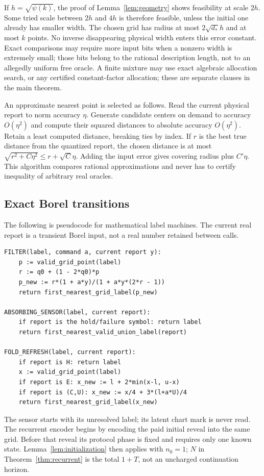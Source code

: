 If $h=\sqrt{\psi(k)}$, the proof of Lemma~\ref{lem:geometry} shows feasibility at scale $2h$. Some tried scale between $2h$ and $4h$ is therefore feasible, unless the initial one already has smaller width. The chosen grid has radius at most $2\sqrt{d_*}h$ and at most $k$ points. No inverse disappearing physical width enters this error constant. Exact comparisons may require more input bits when a nonzero width is extremely small; those bits belong to the rational description length, not to an allegedly uniform free oracle. A finite mixture may use exact algebraic allocation search, or any certified constant-factor allocation; these are separate clauses in the main theorem.

An approximate nearest point is selected as follows. Read the current physical report to norm accuracy $\eta$. Generate candidate centers on demand to accuracy $O(\eta^2)$ and compute their squared distances to absolute accuracy $O(\eta^2)$. Retain a least computed distance, breaking ties by index. If $r$ is the best true distance from the quantized report, the chosen distance is at most $\sqrt{r^2+C\eta^2}\le r+\sqrt C\eta$. Adding the input error gives covering radius plus $C'\eta$. This algorithm compares rational approximations and never has to certify inequality of arbitrary real oracles.

\subsection{Exact Borel transitions}
The following is pseudocode for mathematical label machines. The current real report is a transient Borel input, not a real number retained between calls.
\begin{verbatim}
FILTER(label, command a, current report y):
    p := valid_grid_point(label)
    r := q0 + (1 - 2*q0)*p
    p_new := r*(1 + a*y)/(1 + a*y*(2*r - 1))
    return first_nearest_grid_label(p_new)

ABSORBING_SENSOR(label, current report):
    if report is the hold/failure symbol: return label
    return first_nearest_valid_union_label(report)

FOLD_REFRESH(label, current report):
    if report is H: return label
    x := valid_grid_point(label)
    if report is E: x_new := l + 2*min(x-l, u-x)
    if report is (C,U): x_new := x/4 + 3*(l+a*U)/4
    return first_nearest_grid_label(x_new)
\end{verbatim}
The sensor starts with its unresolved label; its latent chart mark is never read. The recurrent encoder begins by encoding the paid initial reveal into the same grid. Before that reveal its protocol phase is fixed and requires only one known state. Lemma~\ref{lem:initialization} then applies with $n_0=1$; $N$ in Theorem~\ref{thm:recurrent} is the total $1+T$, not an uncharged continuation horizon.


